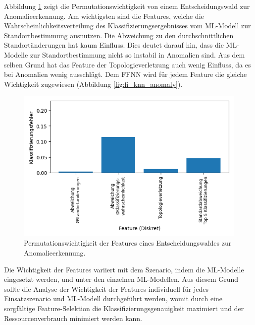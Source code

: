 \newpage
Abbildung \ref{fig:feature_significance_dt_anomaly} zeigt die Permutationswichtigkeit von einem Entscheidungswald zur Anomalieerkennung.
Am wichtigsten sind die Features, welche die Wahrscheinlichkeitsverteilung des Klassifizierungsergebnisses vom ML-Modell zur Standortbestimmung ausnutzen.
Die Abweichung zu den durchschnittlichen Standortänderungen hat kaum Einfluss.
Dies deutet darauf hin, dass die ML-Modelle zur Standortbestimmung nicht so instabil in Anomalien sind.
Aus dem selben Grund hat das Feature der Topologieverletzung auch wenig Einfluss, da es bei Anomalien wenig ausschlägt.
Dem FFNN wird für jedem Feature die gleiche Wichtigkeit zugewiesen (Abbildung \ref{fig:fi_knn_anomaly}).
\begin{figure}[h!]
    \centering
    \includegraphics[width=0.65\linewidth]{images/fi_anomaly_dt.png}
    \caption{Permutationswichtigkeit der Features eines Entscheidungswaldes zur\\ Anomalieerkennung.}
    \label{fig:feature_significance_dt_anomaly}
\end{figure}
\newline
\newline
Die Wichtigkeit der Features variiert mit dem Szenario, indem die ML-Modelle eingesetzt werden, und unter den einzelnen ML-Modellen.
Aus diesem Grund sollte die Analyse der Wichtigkeit der Features individuell für jedes Einsatzszenario und ML-Modell durchgeführt werden,
womit durch eine sorgfältige Feature-Selektion die Klassifizierungsgenauigkeit maximiert und der Ressourcenverbrauch minimiert werden kann.